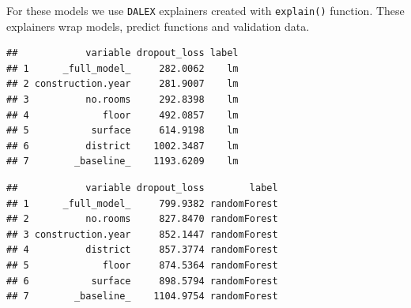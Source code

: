 \documentclass[12pt,]{krantz}
\newenvironment{Shaded}{\begin{snugshade}}{\end{snugshade}}
\newcommand{\DataTypeTok}[1]{\textcolor[rgb]{0.13,0.29,0.53}{#1}}
\newcommand{\DecValTok}[1]{\textcolor[rgb]{0.00,0.00,0.81}{#1}}
\newcommand{\KeywordTok}[1]{\textcolor[rgb]{0.13,0.29,0.53}{\textbf{#1}}}
\newcommand{\NormalTok}[1]{#1}
\newcommand{\OperatorTok}[1]{\textcolor[rgb]{0.81,0.36,0.00}{\textbf{#1}}}
\newcommand{\StringTok}[1]{\textcolor[rgb]{0.31,0.60,0.02}{#1}}
\theoremstyle{definition}
\theoremstyle{definition}
\theoremstyle{definition}
\theoremstyle{remark}
\begin{document}
For these models we use \texttt{DALEX} explainers created with
\texttt{explain()} function. These explainers wrap models, predict
functions and validation data.

\begin{Shaded}
\end{Shaded}

\begin{verbatim}
##            variable dropout_loss label
## 1      _full_model_     282.0062    lm
## 2 construction.year     281.9007    lm
## 3          no.rooms     292.8398    lm
## 4             floor     492.0857    lm
## 5           surface     614.9198    lm
## 6          district    1002.3487    lm
## 7        _baseline_    1193.6209    lm
\end{verbatim}

\begin{Shaded}
\end{Shaded}

\begin{verbatim}
##            variable dropout_loss        label
## 1      _full_model_     799.9382 randomForest
## 2          no.rooms     827.8470 randomForest
## 3 construction.year     852.1447 randomForest
## 4          district     857.3774 randomForest
## 5             floor     874.5364 randomForest
## 6           surface     898.5794 randomForest
## 7        _baseline_    1104.9754 randomForest
\end{verbatim}
\end{document}
